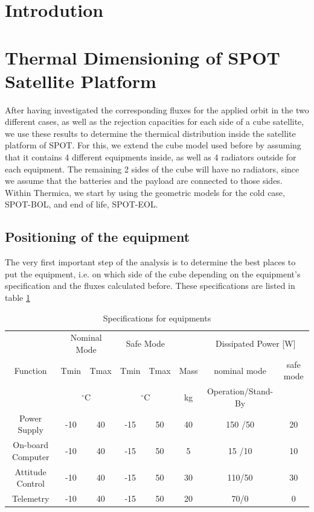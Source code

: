 \section{Introdution}


\section{Thermal Dimensioning of SPOT Satellite Platform}

After having investigated the corresponding fluxes for the applied orbit in the two different cases, as well as the rejection capacities for each side of a cube satellite, we use these results to determine the thermical distribution inside the satellite platform of SPOT. For this, we extend the cube model used before by assuming that it contains 4 different equipments inside, as well as 4 radiators outside for each equipment. The remaining 2 sides of the cube will have no radiators, since we assume that the batteries and the payload are connected to those sides. Within Thermica, we start by using the geometric models for the cold case, SPOT-BOL, and end of life, SPOT-EOL. 

\subsection{Positioning of the equipment}
The very first important step of the analysis is to determine the best places to put the equipment, i.e. on which side of the cube depending on the equipment's specification and the fluxes calculated before. These specifications are listed in table \ref{tab:equipmentspecification}

\begin{table}[h!]
\centering
\begin{tabular}{ | c| c|c|c|c|c|c|c| }
\hline 
&  \multicolumn{2}{|c|}{Nominal Mode} &  \multicolumn{2}{|c|}{Safe Mode} & & \multicolumn{2}{|c|}{Dissipated Power [W] }\\
Function & Tmin & Tmax & Tmin & Tmax & Mass & nominal mode & safe mode  \\
& \multicolumn{2}{|c|}{$^{\circ}$C} & \multicolumn{2}{|c|}{$^{\circ}$C} & kg &Operation/Stand-By &  \\  \hline

Power Supply &-10   & 40  & -15&50  & 40  &  150 /50 & 20  \\ \hline
On-board Computer &-10  & 40 &-15 &50 &5 &15 /10& 10 \\ \hline
Attitude Control &-10  &40 & -15& 50&30 &110/50 &30  \\ \hline
Telemetry &-10  &40 &-15 &50 &20 &70/0 & 0  \\ \hline
\end{tabular}
\caption{Specifications for equipments}
\label{tab:equipmentspecification}
\end{table}


